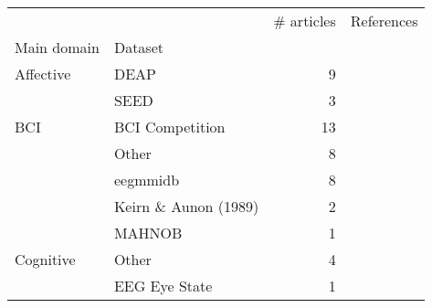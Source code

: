 \begin{tabular}{llrl}
\toprule
      &       &  \# articles &                                                                                                                                                                  References \\
Main domain & Dataset &              &                                                                                                                                                                             \\
\midrule
Affective & DEAP &            9 &                                                            \cite{Li2018, Alhagry2017, BenSaid2017a, Lin2017, Xu2016, Liu2016, Frydenlund2015, Jirayucharoensak2014, Li2013} \\
      & SEED &            3 &                                                                                                                                        \cite{Zhang2018, Liu2016, Zheng2015} \\
BCI & BCI Competition &           13 &  \cite{Gao2018, Lawhern2018, Sakhavi2017, Schirrmeister2017, Schirrmeister2017, Tabar2016a, Tabar2016a, Manor2015, Sakhavi2015, Yang2015a, Ding2015, Ding2015, Cecotti2011} \\
      & Other &            8 &                                                        \cite{Hasib2018, Lawhern2018, Schirrmeister2017, Hajinoroozi2017, Hajinoroozi2017, Hajinoroozi2017, Sun2016, An2016} \\
      & eegmmidb &            8 &                                                                    \cite{Zhang2018c, Major2017, Zhang2017g, Zhang2017d, Zhang2017a, Dharamsi2017, Normand2015, Alomari2013} \\
      & Keirn \& Aunon (1989) &            2 &                                                                                                                                           \cite{Padmanabh2017, Patnaik2017} \\
      & MAHNOB &            1 &                                                                                                                                                      \cite{drouin2016using} \\
Cognitive & Other &            4 &                                                                                                        \cite{Kuanar2018, Hajinoroozi2015, Hajinoroozi2015, Hajinoroozi2015} \\
      & EEG Eye State &            1 &                                                                                                                                                           \cite{Narejo2016} \\

\end{tabular}
